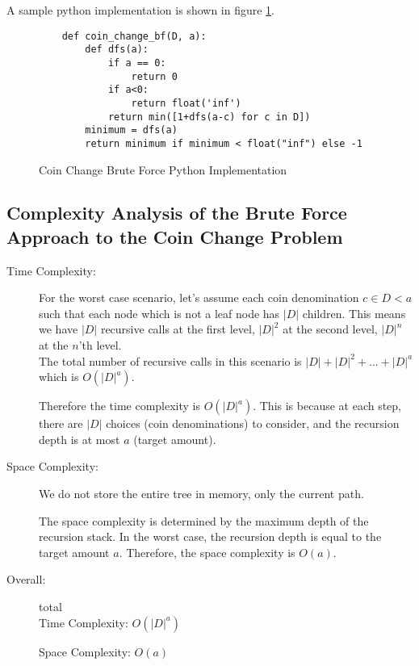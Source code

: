 
A sample python implementation is shown in figure \ref{fig:coin-change-bf}.

\begin{figure}[h]
    \centering
    \begin{lstlisting}
    def coin_change_bf(D, a):
        def dfs(a):
            if a == 0:
                return 0
            if a<0:
                return float('inf')
            return min([1+dfs(a-c) for c in D])
        minimum = dfs(a)
        return minimum if minimum < float("inf") else -1
    \end{lstlisting}
    \caption{Coin Change Brute Force Python Implementation}
    \label{fig:coin-change-bf}
\end{figure}

\subsection{Complexity Analysis of the Brute Force Approach to the Coin Change Problem}

\begin{description}
    \item[Time Complexity:]
    For the worst case scenario, let's assume each coin denomination $c \in D < a$ such that each node which is not a leaf node has $|D|$ children. This means we have $|D|$ recursive calls at the first level, $|D|^{2}$ at the second level, $|D|^{n}$ at the $n$'th level.\\

    The total number of recursive calls in this scenario is $|D| + |D|^{2} + ... + |D|^{a}$ which is $O(|D|^a)$.
    
    Therefore the time complexity is $O(|D|^{a})$. This is because at each step, there are $|D|$ choices (coin denominations) to consider, and the recursion depth is at most $a$ (target amount).
    
        
    \item[Space Complexity:] 
        We do not store the entire tree in memory, only the current path.

        The space complexity is determined by the maximum depth of the recursion stack. In the worst case, the recursion depth is equal to the target amount $a$. Therefore, the space complexity is $O(a)$.
        
        
    \item[Overall:] total\\
        Time Complexity: $O(|D|^a)$

        Space Complexity: $O(a)$
        
\end{description}

